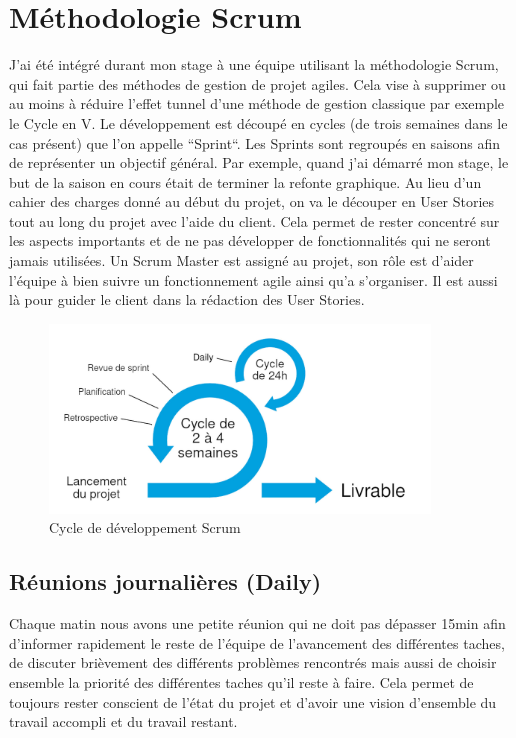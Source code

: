 \documentclass[12pt, a4paper]{report}
\begin{document}
\section{Méthodologie Scrum}
J'ai été intégré durant mon stage à une équipe utilisant la méthodologie Scrum, qui fait partie des méthodes de gestion de projet agiles. Cela vise à supprimer ou au moins à réduire l'effet tunnel d'une méthode de gestion classique par exemple le Cycle en V.\newline
Le développement est découpé en cycles (de trois semaines dans le cas présent) que l'on appelle ``Sprint``.\newline
Les Sprints sont regroupés en saisons afin de représenter un objectif général.
Par exemple, quand j'ai démarré mon stage, le but de la saison en cours était de terminer la refonte graphique.
Au lieu d'un cahier des charges donné au début du projet, on va le découper en User Stories tout au long du projet avec l'aide du client.\newline
Cela permet de rester concentré sur les aspects importants et de ne pas développer de fonctionnalités qui ne seront jamais utilisées.\newline
Un Scrum Master est assigné au projet, son rôle est d'aider l'équipe à bien suivre un fonctionnement agile ainsi qu'a s'organiser. Il est aussi là pour guider le client dans la rédaction des User Stories.
\begin{figure}[H]
    \begin{center}
        \includegraphics[width=0.9\textwidth]{scrum.jpg}
    \end{center}
    \caption{Cycle de développement Scrum}
\end{figure}
\subsection{Réunions journalières (Daily)}
Chaque matin nous avons une petite réunion qui ne doit pas dépasser 15min afin d'informer rapidement le reste de l'équipe de l'avancement des différentes taches, de discuter brièvement des différents problèmes rencontrés mais aussi de choisir ensemble la priorité des différentes taches qu'il reste à faire.\newline
Cela permet de toujours rester conscient de l'état du projet et d'avoir une vision d'ensemble du travail accompli et du travail restant.
\end{document}
